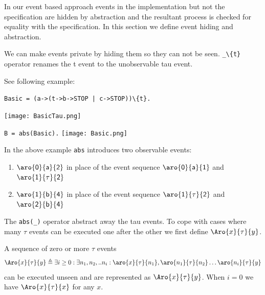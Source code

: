 \documentclass[]{article}
\begin{document}
In our event based approach events in the implementation but not the specification are hidden by abstraction and the resultant process is checked for equality with the specification.  In this section we define event hiding and abstraction.



We can make events private  by  hiding them so they can not be seen.  \verb|_\{t}| operator renames the {\sf t} event to the unobservable  {\sf tau} event.

See following example:

\begin{minipage}{0.45\textwidth}
\noindent\begin{center}\verb$Basic = (a->(t->b->STOP | c->STOP))\{t}.$

 \texttt{[image: BasicTau.png]}
 \end{center}
 \end{minipage}\hspace{\fill}
\begin{minipage}{0.45\textwidth}
\noindent\begin{center}
\verb$B = abs(Basic).$
 \texttt{[image: Basic.png]}
 \end{center}
 \end{minipage}

 In the above example \verb|abs| introduces two observable events:
\begin{center}
 \begin{minipage}{0.7\textwidth}
 \begin{enumerate}
 \item ${\sf \aro{0}{a}{2}}$  in place of  the event sequence ${\sf \aro{0}{a}{1}}$  and  ${\sf \aro{1}{\tau}{2}} $
 \item ${\sf \aro{1}{b}{4}}$  in place of  the event sequence ${\sf \aro{1}{\tau}{2}}$  and  ${\sf \aro{2}{b}{4}} $
 \end{enumerate}
   \end{minipage}
 \end{center}


 The \verb|abs(_)|  operator abstract away the {\sf tau} events. To cope with cases where many $\tau$ events can be executed one after the other we first define  $\Aro{x}{\tau}{y}$.

  A sequence of zero or more $\tau$ events
  \[\Aro{x}{\tau}{y} \triangleq \exists i\geq 0 : \exists n_1,n_2,..n_i :\aro{x}{\tau}{n_1}, \aro{n_1}{\tau}{n_2}\ldots \aro{n_i}{\tau}{y}\]
   can be  executed unseen and are represented as $\Aro{x}{\tau}{y}$. When $i=0$ we have $\Aro{x}{\tau}{x}$ for any $x$.
\end{document}
